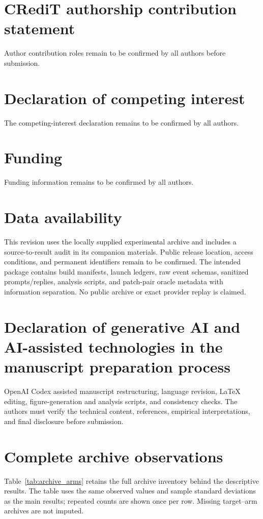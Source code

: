 \documentclass[final,5p,times,number]{elsarticle}
\begin{document}
\section*{CRediT authorship contribution statement}
Author contribution roles remain to be confirmed by all authors before submission.
\section*{Declaration of competing interest}
The competing-interest declaration remains to be confirmed by all authors.
\section*{Funding}
Funding information remains to be confirmed by all authors.
\section*{Data availability}
This revision uses the locally supplied experimental archive and includes a source-to-result audit in its companion materials. Public release location, access conditions, and permanent identifiers remain to be confirmed. The intended package contains build manifests, launch ledgers, raw event schemas, sanitized prompts/replies, analysis scripts, and patch-pair oracle metadata with information separation. No public archive or exact provider replay is claimed.
\section*{Declaration of generative AI and AI-assisted technologies in the manuscript preparation process}
OpenAI Codex assisted manuscript restructuring, language revision, LaTeX editing, figure-generation and analysis scripts, and consistency checks. The authors must verify the technical content, references, empirical interpretations, and final disclosure before submission.

\appendix
\setcounter{table}{0}
\renewcommand{\theHtable}{appendix.\Alph{section}.\arabic{table}}
\section{Complete archive observations}
\label{sec:archive_appendix}
Table~\ref{tab:archive_arms} retains the full archive inventory behind the descriptive results. The table uses the same observed values and sample standard deviations as the main results; repeated counts are shown once per row. Missing target--arm archives are not imputed.




\end{document}
